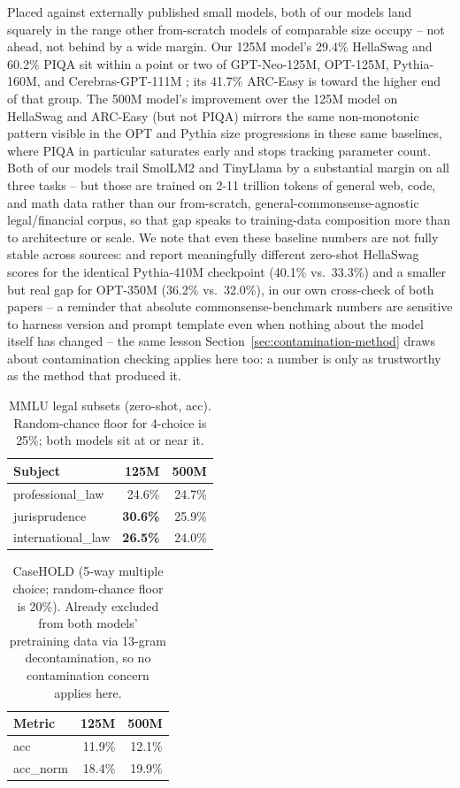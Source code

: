 \documentclass[11pt]{article}
\begin{document}
Placed against externally published small models, both of our models land
squarely in the range other from-scratch models of comparable size occupy
-- not ahead, not behind by a wide margin. Our 125M model's 29.4\% HellaSwag
and 60.2\% PIQA sit within a point or two of GPT-Neo-125M, OPT-125M,
Pythia-160M, and Cerebras-GPT-111M \citep{liu2024mobilellm,
dey2023cerebrasgpt}; its 41.7\% ARC-Easy is toward the higher end of that
group. The 500M model's improvement over the 125M model on HellaSwag and
ARC-Easy (but not PIQA) mirrors the same non-monotonic pattern visible in
the OPT and Pythia size progressions in these same baselines, where PIQA in
particular saturates early and stops tracking parameter count. Both of our
models trail SmolLM2 and TinyLlama by a substantial margin on all three
tasks -- but those are trained on 2-11 trillion tokens of general web, code,
and math data rather than our from-scratch, general-commonsense-agnostic
legal/financial corpus, so that gap speaks to training-data composition more
than to architecture or scale. We note that even these baseline numbers are
not fully stable across sources: \citet{liu2024mobilellm} and
\citet{dey2023cerebrasgpt} report meaningfully different zero-shot HellaSwag
scores for the identical Pythia-410M checkpoint (40.1\% vs.\ 33.3\%) and a
smaller but real gap for OPT-350M (36.2\% vs.\ 32.0\%), in our own
cross-check of both papers -- a reminder that absolute commonsense-benchmark
numbers are sensitive to
harness version and prompt template even when nothing about the model
itself has changed -- the same lesson Section~\ref{sec:contamination-method}
draws about contamination checking applies here too: a number is only as
trustworthy as the method that produced it.

\begin{table}[h]
\centering
\caption{MMLU legal subsets (zero-shot, acc). Random-chance floor for
4-choice is 25\%; both models sit at or near it.}
\label{tab:mmlu}
\begin{tabular}{lrr}
\toprule
\textbf{Subject} & \textbf{125M} & \textbf{500M} \\
\midrule
professional\_law & 24.6\% & 24.7\% \\
jurisprudence & \textbf{30.6\%} & 25.9\% \\
international\_law & \textbf{26.5\%} & 24.0\% \\
\bottomrule
\end{tabular}
\end{table}

\begin{table}[h]
\centering
\caption{CaseHOLD (5-way multiple choice; random-chance floor is 20\%).
Already excluded from both models' pretraining data via 13-gram
decontamination, so no contamination concern applies here.}
\label{tab:casehold}
\begin{tabular}{lrr}
\toprule
\textbf{Metric} & \textbf{125M} & \textbf{500M} \\
\midrule
acc & 11.9\% & 12.1\% \\
acc\_norm & 18.4\% & 19.9\% \\
\bottomrule
\end{tabular}
\end{table}
\end{document}
